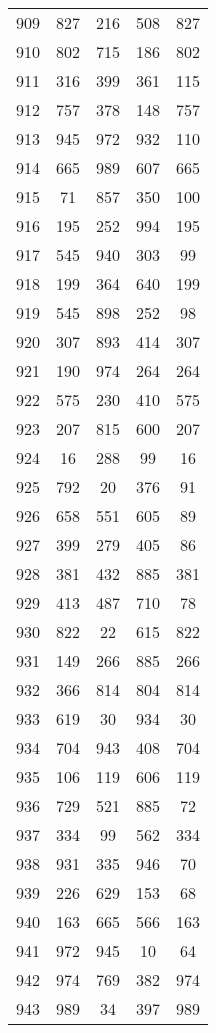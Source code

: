 \documentclass[a4paper,10pt,ngerman]{scrartcl}
\begin{document}
\begin{longtable}[c]{c|c|c|c|c}
    909 & 827 & 216 & 508 & 827 \\
    910 & 802 & 715 & 186 & 802 \\
    911 & 316 & 399 & 361 & 115 \\
    912 & 757 & 378 & 148 & 757 \\
    913 & 945 & 972 & 932 & 110 \\
    914 & 665 & 989 & 607 & 665 \\
    915 & 71 & 857 & 350 & 100 \\
    916 & 195 & 252 & 994 & 195 \\
    917 & 545 & 940 & 303 & 99 \\
    918 & 199 & 364 & 640 & 199 \\
    919 & 545 & 898 & 252 & 98 \\
    920 & 307 & 893 & 414 & 307 \\
    921 & 190 & 974 & 264 & 264 \\
    922 & 575 & 230 & 410 & 575 \\
    923 & 207 & 815 & 600 & 207 \\
    924 & 16 & 288 & 99 & 16 \\
    925 & 792 & 20 & 376 & 91 \\
    926 & 658 & 551 & 605 & 89 \\
    927 & 399 & 279 & 405 & 86 \\
    928 & 381 & 432 & 885 & 381 \\
    929 & 413 & 487 & 710 & 78 \\
    930 & 822 & 22 & 615 & 822 \\
    931 & 149 & 266 & 885 & 266 \\
    932 & 366 & 814 & 804 & 814 \\
    933 & 619 & 30 & 934 & 30 \\
    934 & 704 & 943 & 408 & 704 \\
    935 & 106 & 119 & 606 & 119 \\
    936 & 729 & 521 & 885 & 72 \\
    937 & 334 & 99 & 562 & 334 \\
    938 & 931 & 335 & 946 & 70 \\
    939 & 226 & 629 & 153 & 68 \\
    940 & 163 & 665 & 566 & 163 \\
    941 & 972 & 945 & 10 & 64 \\
    942 & 974 & 769 & 382 & 974 \\
    943 & 989 & 34 & 397 & 989 \\

\end{longtable}
\end{document}
